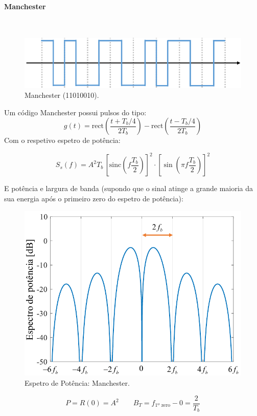 \clearpage
\paragraph*{Manchester}\mbox{}\\
\label{line:manchester}
\begin{figure}[H]
    \centering
    \includegraphics[width = 0.8\linewidth]{img/digital/line-codes/LManchester.png}
    \caption{Manchester (11010010).}
    \label{fig:manchester}
\end{figure}
\noindent Um código Manchester possui pulsos do tipo:
$$
    g(t) = \text{rect}\left(\frac{t+T_b/4}{2T_b}\right) - \text{rect}\left(\frac{t - T_b/4}{2T_b}\right) 
$$
\noindent Com o respetivo espetro de potência:

$$
    \boxed{S_s(f) = A^2 T_b\, \left[\text{sinc}(f\frac{T_b}{2})\right]^2 \cdot \left[\sin(\pi f \frac{T_b}{2})\right]^2 }
$$

\noindent E potência e largura de banda (supondo que o sinal atinge a grande maioria da sua energia após o primeiro zero do espetro de potência):

\begin{figure}[H]
    \centering
    \includegraphics[width = 0.7\linewidth]{img/digital/line-codes/PManchester.png}
    \caption{Espetro de Potência: Manchester.}
    \label{fig:PManchester}
\end{figure}

$$
    \boxed{P = R(0) = A^2}\qquad
    \boxed{B_T = f_{\text{1º zero}} - 0 = \frac{2}{T_b}}
$$
